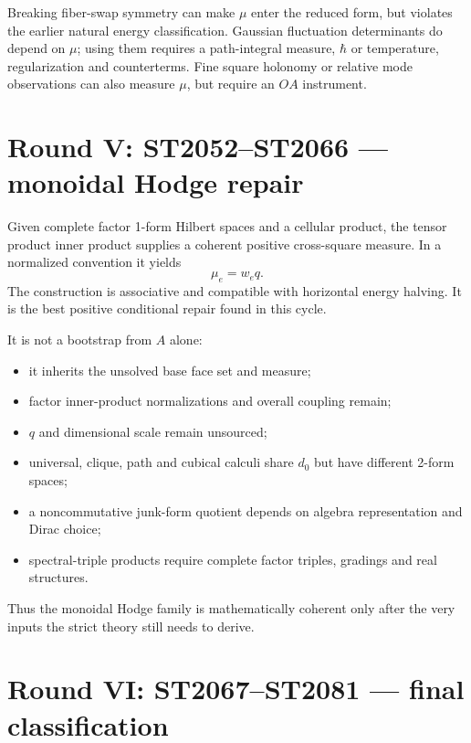 \documentclass[11pt,a4paper]{article}
\begin{document}
Breaking fiber-swap symmetry can make $\mu$ enter the reduced form, but violates
the earlier natural energy classification.  Gaussian fluctuation determinants
do depend on $\mu$; using them requires a path-integral measure, $\hbar$ or
temperature, regularization and counterterms.  Fine square holonomy or relative
mode observations can also measure $\mu$, but require an $OA$ instrument.

\section{Round V: ST2052--ST2066 --- monoidal Hodge repair}

Given complete factor 1-form Hilbert spaces and a cellular product, the tensor
product inner product supplies a coherent positive cross-square measure.  In a
normalized convention it yields
\[
\mu_e=w_e q.
\]
The construction is associative and compatible with horizontal energy
halving.  It is the best positive conditional repair found in this cycle.

It is not a bootstrap from $A$ alone:
\begin{itemize}
\item it inherits the unsolved base face set and measure;
\item factor inner-product normalizations and overall coupling remain;
\item $q$ and dimensional scale remain unsourced;
\item universal, clique, path and cubical calculi share $d_0$ but have different
      2-form spaces;
\item a noncommutative junk-form quotient depends on algebra representation and
      Dirac choice;
\item spectral-triple products require complete factor triples, gradings and
      real structures.
\end{itemize}

Thus the monoidal Hodge family is mathematically coherent only after the very
inputs the strict theory still needs to derive.

\section{Round VI: ST2067--ST2081 --- final classification}
\end{document}

